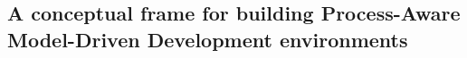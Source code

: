 \subsection{A conceptual frame for building Process-Aware Model-Driven
Development environments}
\label{sec:meta}
